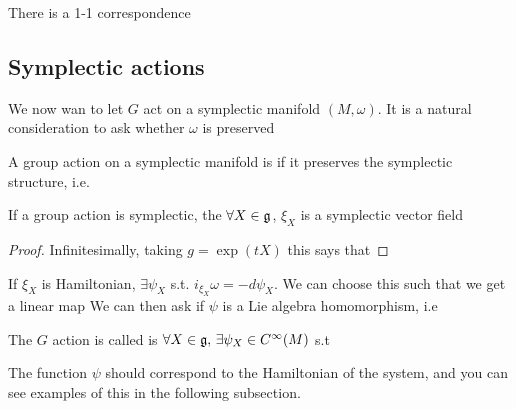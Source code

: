 \documentclass{article}
\begin{document}
\begin{theorem}
There is a 1-1 correspondence
\end{theorem}

\subsection{Symplectic actions}


We now wan to let $G$ act on a symplectic manifold $(M,\omega)$. It is a natural consideration to ask whether $\omega$ is preserved

\begin{definition}
A group action on a symplectic manifold is  if it preserves the symplectic structure, i.e.
\end{definition}
\begin{prop}
If a group action is symplectic, the $\forall X \in \mathfrak{g}$, $\xi_X$ is a symplectic vector field
\end{prop}
\begin{proof}
Infinitesimally, taking $g = \exp(tX)$ this says that 
\end{proof}
If $\xi_X$ is Hamiltonian, $\exists \psi_X$ s.t. $i_{\xi_X} \omega = -d\psi_X$. We can choose this such that we get a linear map 
We can then ask if $\psi$ is a Lie algebra homomorphism, i.e 

\begin{definition}
The $G$ action is called  is $\forall X \in \mathfrak{g}, \, \exists \psi_X \in C^\infty(M)$ s.t 
\end{definition}

\begin{remark}
The function $\psi$ should correspond to the Hamiltonian of the system, and you can see examples of this in the following subsection. 
\end{remark}
\end{document}

